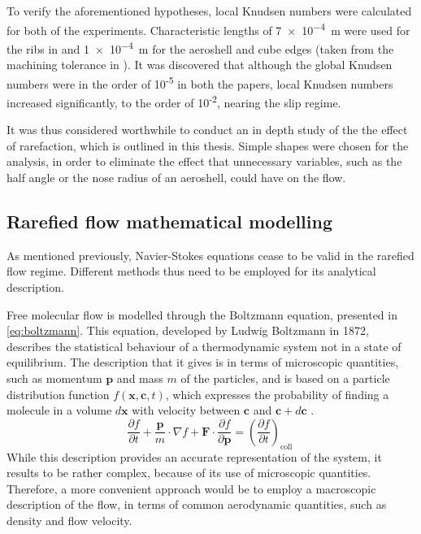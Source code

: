 To verify the aforementioned hypotheses, local Knudsen numbers were calculated for both of the experiments. Characteristic lengths of \qty{7e-4}{\m} were used for the ribs in \cite{hathoraero2} and \qty{1e-4}{\m} for the aeroshell and cube edges (taken from the machining tolerance in \cite{rees}). It was discovered that although the global Knudsen numbers were in the order of 10\textsuperscript{-5} in both the papers, local Knudsen numbers increased significantly, to the order of 10\textsuperscript{-2}, nearing the slip regime.

It was thus considered worthwhile to conduct an in depth study of the the effect of rarefaction, which is outlined in this thesis. Simple shapes were chosen for the analysis, in order to eliminate the effect that unnecessary variables, such as the half angle or the nose radius of an aeroshell, could have on the flow.

\subsection{Rarefied flow mathematical modelling}
As mentioned previously, Navier-Stokes equations cease to be valid in the rarefied flow regime. Different methods thus need to be employed for its analytical description.

Free molecular flow is modelled through the Boltzmann equation, presented in \autoref{eq:boltzmann}. This equation, developed by Ludwig Boltzmann in 1872, describes the statistical behaviour of a thermodynamic system not in a state of equilibrium. The description that it gives is in terms of microscopic quantities, such as momentum $\mathbf{p}$ and mass $m$ of the particles, and is based on a particle distribution function $f (\mathbf{x}, \mathbf{c},t)$, which expresses the probability of finding a molecule in a volume $d\mathbf{x}$ with velocity between $\mathbf{c}$ and $\mathbf{c} + d \mathbf{c}$ \cite{burnett}.
\begin{equation}
    \frac{\partial f}{\partial t}+\frac{\mathbf{p}}{m} \cdot \nabla f+\mathbf{F} \cdot \frac{\partial f}{\partial \mathbf{p}}=\left(\frac{\partial f}{\partial t}\right)_{\text {coll }}
    \label{eq:boltzmann}
\end{equation}
While this description provides an accurate representation of the system, it results to be rather complex, because of its use of microscopic quantities. Therefore, a more convenient approach would be to employ a macroscopic description of the flow, in terms of common aerodynamic quantities, such as density and flow velocity.

